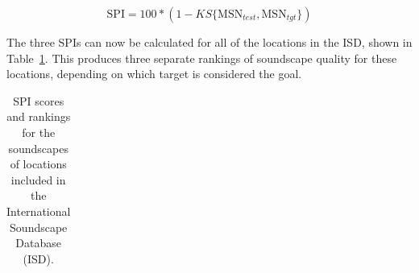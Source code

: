 \documentclass[
  authoryear,
  preprint,
  3p]{elsarticle}
\begin{document}
\[
\text{SPI} = 100 * (1 - KS\{\text{MSN}_{test}, \text{MSN}_{tgt}\})
\]

The three SPIs can now be calculated for all of the locations in the
ISD, shown in Table~\ref{tbl-ex-spis}. This produces three separate
rankings of soundscape quality for these locations, depending on which
target is considered the goal.

\begin{longtable}[]{@{}
  >{\raggedleft\arraybackslash}p{}
  >{\raggedright\arraybackslash}p{}
  >{\raggedright\arraybackslash}p{}
  >{\raggedright\arraybackslash}p{}@{}}

\caption{\label{tbl-ex-spis}SPI scores and rankings for the soundscapes
of locations included in the International Soundscape Database (ISD).}

\tabularnewline


\end{longtable}
\end{document}
